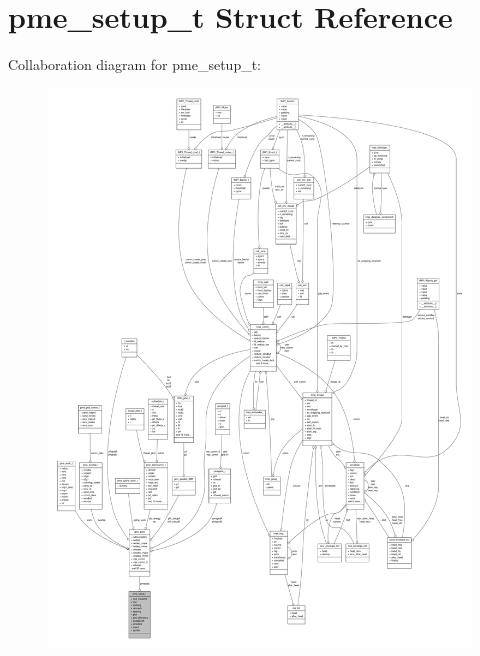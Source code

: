 \hypertarget{structpme__setup__t}{\section{pme\-\_\-setup\-\_\-t \-Struct \-Reference}
\label{structpme__setup__t}
}


\-Collaboration diagram for pme\-\_\-setup\-\_\-t\-:
\nopagebreak
\begin{figure}[H]
\begin{center}
\leavevmode
\includegraphics[width=350pt]{structpme__setup__t__coll__graph}
\end{center}
\end{figure}
